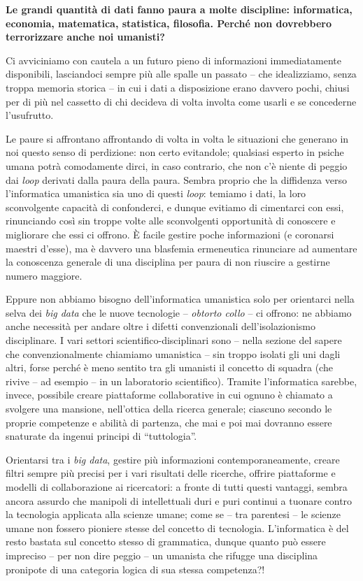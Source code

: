 \documentclass[
  b5paper,
  twoside,
  11pt,
  chapterprefix=false,
  bibliography=totocnumbered,
  listof=flat]{scrbook}
\begin{document}
\textbf{Le grandi quantità di dati fanno paura a molte discipline: informatica,
economia, matematica, statistica, filosofia. Perché non dovrebbero
terrorizzare anche noi umanisti?}

Ci avviciniamo con cautela a un futuro pieno di informazioni
immediatamente disponibili, lasciandoci sempre più alle spalle un
passato -- che idealizziamo, senza troppa memoria storica -- in cui i
dati a disposizione erano davvero pochi, chiusi per di più nel cassetto
di chi decideva di volta involta come usarli e se concederne
l'usufrutto.

Le paure si affrontano affrontando di volta in volta le situazioni che
generano in noi questo senso di perdizione: non certo evitandole;
qualsiasi esperto in psiche umana potrà comodamente dirci, in caso
contrario, che non c'è niente di peggio dai \emph{loop} derivati dalla paura
della paura. Sembra proprio che la diffidenza verso l'informatica
umanistica sia uno di questi \emph{loop}: temiamo i dati, la loro
sconvolgente capacità di confonderci, e dunque evitiamo di cimentarci
con essi, rinunciando così sin troppe volte alle sconvolgenti
opportunità di conoscere e migliorare che essi ci offrono. È facile
gestire poche informazioni (e coronarsi maestri d'esse), ma è davvero
una blasfemia ermeneutica rinunciare ad aumentare la conoscenza generale
di una disciplina per paura di non riuscire a gestirne numero maggiore.

Eppure non abbiamo bisogno dell'informatica umanistica solo per
orientarci nella selva dei \emph{big data} che le nuove tecnologie --
\emph{obtorto collo} -- ci offrono: ne abbiamo anche necessità per andare
oltre i difetti convenzionali dell'isolazionismo disciplinare. I vari
settori scientifico-disciplinari sono -- nella sezione del sapere che
convenzionalmente chiamiamo umanistica -- sin troppo isolati gli uni
dagli altri, forse perché è meno sentito tra gli umanisti il concetto di
squadra (che rivive -- ad esempio -- in un laboratorio scientifico).
Tramite l'informatica sarebbe, invece, possibile creare piattaforme
collaborative in cui ognuno è chiamato a svolgere una mansione,
nell'ottica della ricerca generale; ciascuno secondo le proprie
competenze e abilità di partenza, che mai e poi mai dovranno essere
snaturate da ingenui principi di \enquote{tuttologia}.

Orientarsi tra i \emph{big data}, gestire più informazioni
contemporaneamente, creare filtri sempre più precisi per i vari
risultati delle ricerche, offrire piattaforme e modelli di
collaborazione ai ricercatori: a fronte di tutti questi vantaggi, sembra
ancora assurdo che manipoli di intellettuali duri e puri continui a
tuonare contro la tecnologia applicata alla scienze umane; come se --
tra parentesi -- le scienze umane non fossero pioniere stesse del
concetto di tecnologia. L'informatica è del resto bastata sul concetto
stesso di grammatica, dunque quanto può essere impreciso -- per non dire
peggio -- un umanista che rifugge una disciplina pronipote di una
categoria logica di sua stessa competenza?!
\end{document}
